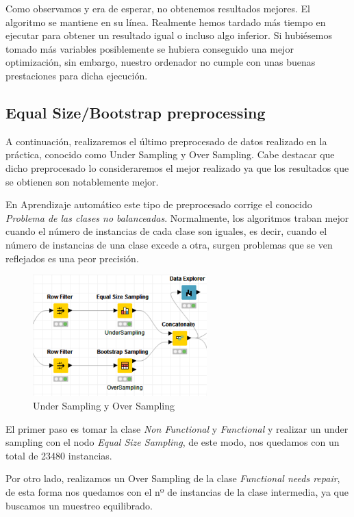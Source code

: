 	Como observamos y era de esperar, no obtenemos resultados mejores. El algoritmo se mantiene en su línea. Realmente hemos tardado más tiempo en ejecutar para obtener un resultado igual o incluso algo inferior. Si hubiésemos tomado más variables posiblemente se hubiera conseguido una mejor optimización, sin embargo, nuestro ordenador no cumple con unas buenas prestaciones para dicha ejecución.
	
	
	\subsection{Equal Size/Bootstrap preprocessing}
	
	\hspace{1cm} A continuación, realizaremos el último preprocesado de datos realizado en la práctica, conocido como Under Sampling y Over Sampling. Cabe destacar que dicho preprocesado lo consideraremos el mejor realizado ya que los resultados que se obtienen son notablemente mejor.
	
	En Aprendizaje automático este tipo de preprocesado corrige el conocido \textit{Problema de las clases no balanceadas}. Normalmente, los algoritmos traban mejor cuando el número de instancias de cada clase son iguales, es decir, cuando el número de instancias de una clase excede a otra, surgen problemas que se ven reflejados es una peor precisión. 
	
	
	\begin{figure}[H]
		\centering
		\includegraphics[width=0.6\textwidth]{img/underover.png}
		\caption{Under Sampling y Over Sampling}
	\end{figure}
	
	El primer paso es tomar la clase \textit{Non Functional} y \textit{Functional} y realizar un under sampling con el nodo \textit{Equal Size Sampling}, de este modo, nos quedamos con un total de 23480 instancias.
	
	Por otro lado, realizamos un Over Sampling de la clase \textit{Functional needs repair}, de esta forma nos quedamos con el nº de instancias de la clase intermedia, ya que buscamos un muestreo equilibrado.
	
